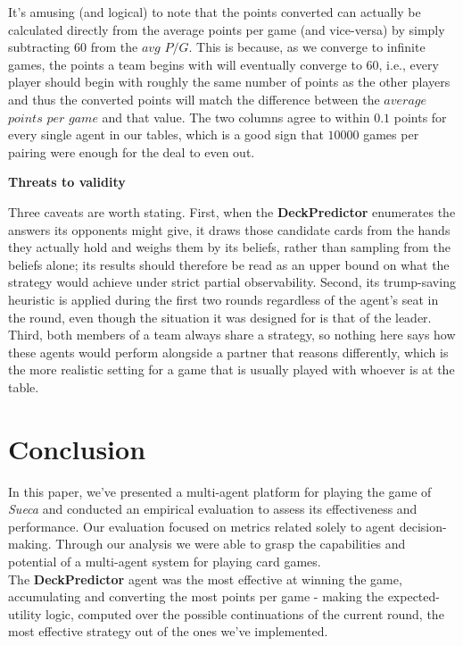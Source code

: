 \documentclass[sigconf]{acmart}
\begin{document}
\noindent It's amusing (and logical) to note that the points converted can actually be calculated directly from the average points per game (and vice-versa) by simply subtracting $60$ from the $avg$ $P/G$. This is because, as we converge to infinite games, the points a team begins with will eventually converge to $60$, i.e., every player should begin with roughly the same number of points as the other players and thus the converted points will match the difference between the $average$ $points$ $per$ $game$ and that value. The two columns agree to within $0.1$ points for every single agent in our tables, which is a good sign that $10000$ games per pairing were enough for the deal to even out.

{\centering\fontsize{9}{24}\selectfont\textbf{Threats to validity}\par}
\vspace{2mm} %

\noindent Three caveats are worth stating. First, when the \textbf{DeckPredictor} enumerates the answers its opponents might give, it draws those candidate cards from the hands they actually hold and weighs them by its beliefs, rather than sampling from the beliefs alone; its results should therefore be read as an upper bound on what the strategy would achieve under strict partial observability. Second, its trump-saving heuristic is applied during the first two rounds regardless of the agent's seat in the round, even though the situation it was designed for is that of the leader. Third, both members of a team always share a strategy, so nothing here says how these agents would perform alongside a partner that reasons differently, which is the more realistic setting for a game that is usually played with whoever is at the table.

\section{Conclusion}

In this paper, we've presented a multi-agent platform for playing the game of \textit{Sueca} and conducted an empirical evaluation to assess its effectiveness and performance. Our evaluation focused on metrics related solely to agent decision-making. Through our analysis we were able to grasp the capabilities and potential of a multi-agent system for playing card games.\\

The \textbf{DeckPredictor} agent was the most effective at winning the game, accumulating and converting the most points per game - making the expected-utility logic, computed over the possible continuations of the current round, the most effective strategy out of the ones we've implemented.\\
\end{document}
